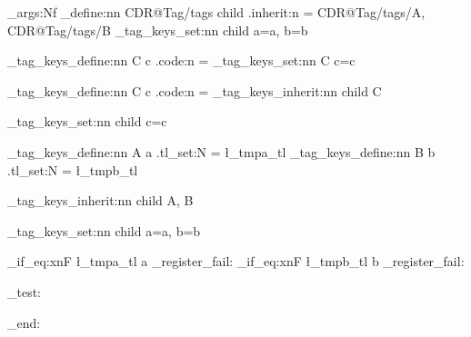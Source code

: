 \exp_args:Nf \keys_define:nn { CDR@Tag/tags } {
  child .inherit:n = { CDR@Tag/tags/A, CDR@Tag/tags/B}
}
\CDR_tag_keys_set:nn { child } { a=a, b=b }

\CDR_tag_keys_define:nn { C } { c .code:n =  }
\CDR_tag_keys_set:nn { C } { c=c }




\CDR_tag_keys_define:nn { C } { c .code:n =  }
\CDR_tag_keys_inherit:nn { child } { C }

\CDR_tag_keys_set:nn { child } { c=c }

\CDR_tag_keys_define:nn { A } { a .tl_set:N = \l_tmpa_tl }
\CDR_tag_keys_define:nn { B } { b .tl_set:N = \l_tmpb_tl }

\CDR_tag_keys_inherit:nn { child } { A, B }

\CDR_tag_keys_set:nn { child } { a=a, b=b }


\tl_if_eq:xnF { \l_tmpa_tl } { a } { \CDR_register_fail: }
\tl_if_eq:xnF { \l_tmpb_tl } { b } { \CDR_register_fail: }

\CDR_test:

\group_end:
\ExplSyntaxOff
